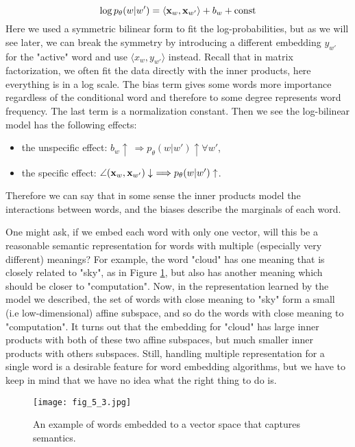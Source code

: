 \documentclass[../book-template.tex]{subfiles}
\begin{document}
\begin{equation}\label{eq_5_log_bi}
	\log p_{\theta}(w|w')=\langle {\bf x}_w,{\bf x}_{w'}\rangle + b_w + {\rm const}
\end{equation}
Here we used a symmetric bilinear form to fit the log-probabilities, but as we will see later, we can break the symmetry by introducing a different embedding $y_{w'}$ for the "active" word and use $\langle x_w,y_{w'}\rangle$ instead. Recall that in matrix factorization, we often fit the data directly with the inner products, here everything is in a log scale. The bias term gives some words more importance regardless of the conditional word and therefore to some degree represents word frequency. The last term is a normalization constant. Then we see the log-bilinear model has the following effects:
\begin{itemize}
	\item the unspecific effect: $b_w \uparrow\ \Longrightarrow p_{\theta}(w|w')\uparrow \forall w'$,
	\item the specific effect: $\angle({\bf x}_w,{\bf x}_{w'})\downarrow\ \Longrightarrow p_{\theta}(w|w')\uparrow$.
\end{itemize}
Therefore we can say that in some sense the inner products model the interactions between words, and the biases describe the marginals of each word.
\begin{remark}
	One might ask, if we embed each word with only one vector, will this be a reasonable semantic representation for words with multiple (especially very different) meanings? For example, the word "cloud" has one meaning that is closely related to "sky", as in Figure \ref{fig_5_3}, but also has another meaning which should be closer to "computation". 
	Now, in the representation learned by the model we described, the set of words with close meaning to "sky" form a small (i.e low-dimensional) affine subspace, and so do the words with close meaning to "computation".
	It turns out that the embedding for "cloud" has large inner products with both of these two affine subspaces, but much smaller inner products with others subspaces. 
	Still, handling multiple representation for a single word is a desirable feature for word embedding algorithms, but we have to keep in mind that we have no idea what the right thing to do is.
\end{remark}
\begin{figure}[t] 
	\centering 
	\texttt{[image: fig\_5\_3.jpg]} 
	\caption{An example of words embedded to a vector space that captures semantics.}\label{fig_5_3}
\end{figure}
\end{document}
